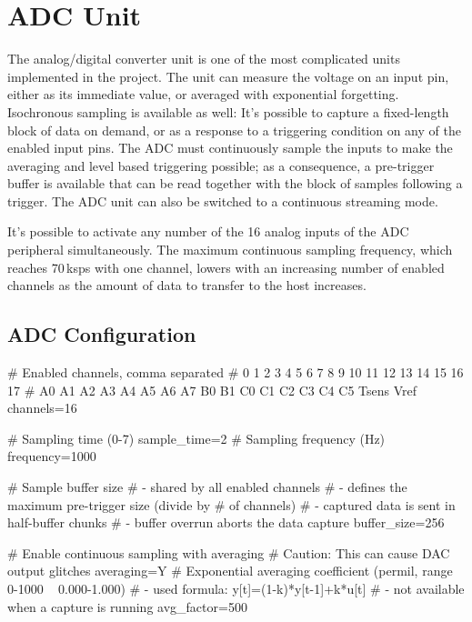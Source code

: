 \section{ADC Unit}

The analog/digital converter unit is one of the most complicated units implemented in the project. The unit can measure the voltage on an input pin, either as its immediate value, or averaged with exponential forgetting. Isochronous sampling is available as well: It's possible to capture a fixed-length block of data on demand, or as a response to a triggering condition on any of the enabled input pins. The \gls{ADC} must continuously sample the inputs to make the averaging and level based triggering possible; as a consequence, a pre-trigger buffer is available that can be read together with the block of samples following a trigger. The \gls{ADC} unit can also be switched to a continuous streaming mode.

It's possible to activate any number of the 16 analog inputs of the \gls{ADC} peripheral simultaneously. The maximum continuous sampling frequency, which reaches 70\,ksps with one channel, lowers with an increasing number of enabled channels as the amount of data to transfer to the host increases.



\subsection{ADC Configuration}

\begin{inicode}
# Enabled channels, comma separated
#  0  1  2  3  4  5  6  7    8  9   10 11 12 13 14 15   16    17
# A0 A1 A2 A3 A4 A5 A6 A7   B0 B1   C0 C1 C2 C3 C4 C5   Tsens Vref
channels=16

# Sampling time (0-7)
sample_time=2
# Sampling frequency (Hz)
frequency=1000

# Sample buffer size
# - shared by all enabled channels
# - defines the maximum pre-trigger size (divide by # of channels)
# - captured data is sent in half-buffer chunks
# - buffer overrun aborts the data capture
buffer_size=256

# Enable continuous sampling with averaging
# Caution: This can cause DAC output glitches
averaging=Y
# Exponential averaging coefficient (permil, range 0-1000 ~ 0.000-1.000)
# - used formula: y[t]=(1-k)*y[t-1]+k*u[t]
# - not available when a capture is running
avg_factor=500
\end{inicode}

